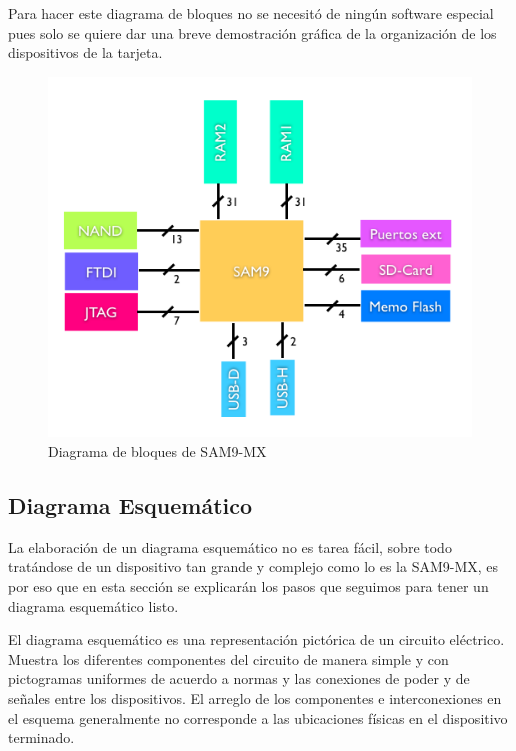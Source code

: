 Para hacer este diagrama de bloques no se necesitó de ningún software
especial pues solo se quiere dar una breve demostración gráfica de
la organización de los dispositivos de la tarjeta. 

%
\begin{figure}
\includegraphics[scale=0.6]{img/diagrama_bloques}

\caption{\label{fig:bloques}Diagrama de bloques de SAM9-MX}



\end{figure}


\pagebreak{}


\subsection{Diagrama Esquem\'atico}

La elaboración de un diagrama esquemático no es tarea fácil, sobre
todo tratándose de un dispositivo tan grande y complejo como lo es
la SAM9-MX, es por eso que en esta sección se explicarán los pasos
que seguimos para tener un diagrama esquemático listo.

El diagrama esquem\'{a}tico es una representaci\'{o}n pict\'{o}rica
de un circuito el\'{e}ctrico. Muestra los diferentes componentes del
circuito de manera simple y con pictogramas uniformes de acuerdo a
normas y las conexiones de poder y de señales entre los dispositivos.
El arreglo de los componentes e interconexiones en el esquema generalmente
no corresponde a las ubicaciones físicas en el dispositivo terminado. 

